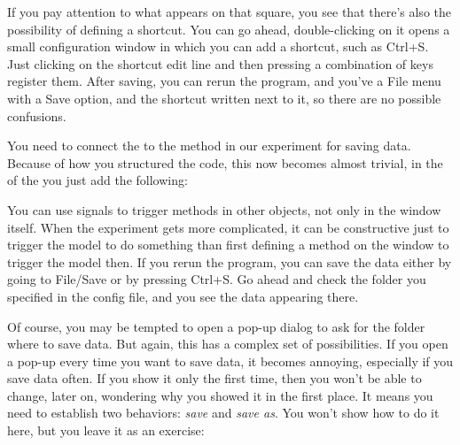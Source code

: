 If you pay attention to what appears on that square, you see that there's also the possibility of defining a shortcut. You can go ahead, double-clicking on it opens a small configuration window in which you can add a shortcut, such as Ctrl+S. Just clicking on the shortcut edit line and then pressing a combination of keys register them. After saving, you can rerun the program, and you've a File menu with a Save option, and the shortcut written next to it, so there are no possible confusions.

You need to connect the  to the method in our experiment for saving data. Because of how you structured the code, this now becomes almost trivial, in the  of the  you just add the following:


You can use signals to trigger methods in other objects, not only in the window itself. When the experiment gets more complicated, it can be constructive just to trigger the model to do something than first defining a method on the window to trigger the model then. If you rerun the program, you can save the data either by going to File/Save or by pressing Ctrl+S. Go ahead and check the folder you specified in the config file, and you see the data appearing there.


Of course, you may be tempted to open a pop-up dialog to ask for the folder where to save data. But again, this has a complex set of possibilities. If you open a pop-up every time you want to save data, it becomes annoying, especially if you save data often. If you show it only the first time, then you won't be able to change, later on, wondering why you showed it in the first place. It means you need to establish two behaviors: \emph{save} and \emph{save as}. You won't show how to do it here, but you leave it as an exercise:

